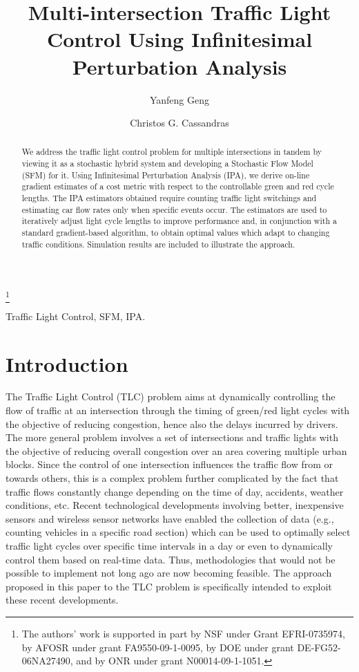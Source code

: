 \documentclass{ifacconf}\usepackage{graphicx}
\begin{document}
\begin{frontmatter}
\title{Multi-intersection Traffic Light Control Using Infinitesimal Perturbation
Analysis}
\thanks[footnoteinfo]{The authors' work is supported in part by NSF under
Grant EFRI-0735974, by AFOSR under grant FA9550-09-1-0095, by DOE under grant
DE-FG52-06NA27490, and by ONR under grant N00014-09-1-1051.}
\author[First]{Yanfeng Geng}
\author[First]{Christos G. Cassandras}
\address[First]{Division of Systems Engineering and Center for Information and Systems Engineering, 	Boston University, Brookline, MA, 02446 (e-mail: gengyf@bu.edu, cgc@bu.edu)}
\begin{abstract}                We address the traffic light control problem for multiple intersections in tandem by
viewing it as a stochastic hybrid system and developing a Stochastic Flow
Model (SFM) for it. Using Infinitesimal Perturbation Analysis (IPA), we derive
on-line gradient estimates of a cost metric with respect to the controllable
green and red cycle lengths. The IPA estimators obtained require counting
traffic light switchings and estimating car flow rates only when specific
events occur. The estimators are used to iteratively adjust light cycle
lengths to improve performance and, in conjunction with a standard
gradient-based algorithm, to obtain optimal values which adapt to changing
traffic conditions. Simulation results are included to illustrate the approach.
\end{abstract}
\begin{keyword}
Traffic Light Control, SFM, IPA.
\end{keyword}
\end{frontmatter}



\section{Introduction}

The Traffic Light Control (TLC) problem aims at dynamically controlling the
flow of traffic at an intersection through the timing of green/red light
cycles with the objective of reducing congestion, hence also the delays
incurred by drivers. The more general problem involves a set of intersections
and traffic lights with the objective of reducing overall congestion over an
area covering multiple urban blocks. Since the control of one intersection
influences the traffic flow from or towards others, this is a complex problem
further complicated by the fact that traffic flows constantly change depending
on the time of day, accidents, weather conditions, etc. Recent technological
developments involving better, inexpensive sensors and wireless sensor
networks have enabled the collection of data (e.g., counting vehicles in a
specific road section) which can be used to optimally select traffic light
cycles over specific time intervals in a day or even to dynamically control
them based on real-time data. Thus, methodologies that would not be possible
to implement not long ago are now becoming feasible. The approach proposed in
this paper to the TLC problem is specifically intended to exploit these recent developments.
\end{document}
